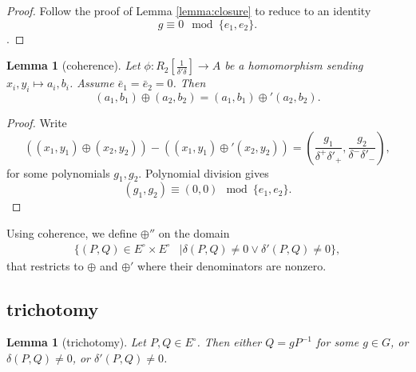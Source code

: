 \documentclass[12pt]{article}
\newtheorem{lemma}[theorem]{Lemma}
\newcommand{\f}[1]{\frac{1}{#1}}
\newcommand{\Eoo}{E^{\circ}}
\def\cong{\equiv}
\begin{document}
\begin{proof} Follow the proof of Lemma \ref{lemma:closure} to reduce
  to an identity
\[
g\cong 0 \mod \{e_1,e_2\}.
\].
\end{proof}

\begin{lemma}[coherence] \label{lemma:extend} Let $\phi:R_2[\f{\delta'\delta}]\to
  A$ be a homomorphism sending $x_i,y_i\mapsto a_i,b_i$.  Assume $\bar
  e_1 = \bar e_ 2 = 0$. Then
\[
(a_1,b_1)\oplus (a_2,b_2)=(a_1,b_1)\oplus' (a_2,b_2).
\]
\end{lemma}

\begin{proof} Write
\[
((x_1,y_1)\oplus (x_2,y_2)) -
((x_1,y_1)\oplus' (x_2,y_2) ) = 
(\frac{g_1}{\delta^+\delta'_+},\frac{g_2}{\delta^-\delta'_-}),
\]
for some polynomials $g_1,g_2$.   Polynomial division gives
\[
(g_1,g_2) \cong (0,0) \mod \{e_1,e_2\}.
\]
\end{proof}

Using coherence, we define $\oplus''$ on the domain
\begin{align*}
\{(P,Q)\in \Eoo\times \Eoo &\mid 
\delta(P,Q)\ne 0 \vee
\delta'(P,Q)\ne 0 \},
\end{align*}
that restricts to $\oplus$ and $\oplus'$ where their denominators are nonzero.  

\subsection{trichotomy}

\begin{lemma}[trichotomy]\label{lemma:noco} 
  Let $P,Q\in \Eoo$.  Then either $Q=g P^{-1}$ for some $g\in G$, or
  $\delta(P,Q)\ne 0$, or $\delta'(P,Q)\ne 0$.
\end{lemma}
\end{document}
